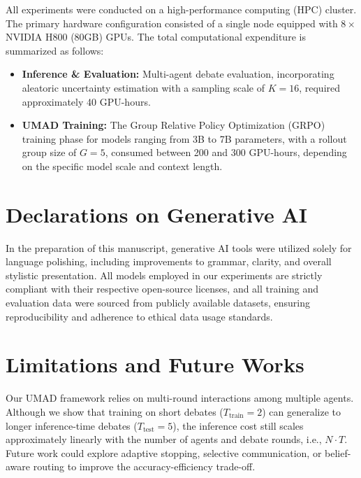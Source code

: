 \documentclass{article}
\theoremstyle{plain}
\theoremstyle{definition}
\theoremstyle{remark}
\begin{document}
All experiments were conducted on a high-performance computing (HPC) cluster. The primary hardware configuration consisted of a single node equipped with $8 \times$ NVIDIA H800 (80GB) GPUs. The total computational expenditure is summarized as follows:

\begin{itemize}

\item \textbf{Inference \& Evaluation:} Multi-agent debate evaluation, incorporating aleatoric uncertainty estimation with a sampling scale of $K=16$, required approximately 40 GPU-hours.

\item \textbf{UMAD Training:} The Group Relative Policy Optimization (GRPO) training phase for models ranging from 3B to 7B parameters, with a rollout group size of $G=5$, consumed between 200 and 300 GPU-hours, depending on the specific model scale and context length.

\end{itemize}

\section{Declarations on Generative AI}

In the preparation of this manuscript, generative AI tools were utilized solely for language polishing, including improvements to grammar, clarity, and overall stylistic presentation. All models employed in our experiments are strictly compliant with their respective open-source licenses, and all training and evaluation data were sourced from publicly available datasets, ensuring reproducibility and adherence to ethical data usage standards.












\section{Limitations and Future Works}
Our UMAD framework relies on multi-round interactions among multiple agents. Although we show that training on short debates ($T_{\mathrm{train}}=2$) can generalize to longer inference-time debates ($T_{\mathrm{test}}=5$), the inference cost still scales approximately linearly with the number of agents and debate rounds, i.e., $N \cdot T$. Future work could explore adaptive stopping, selective communication, or belief-aware routing to improve the accuracy-efficiency trade-off. 
\end{document}
